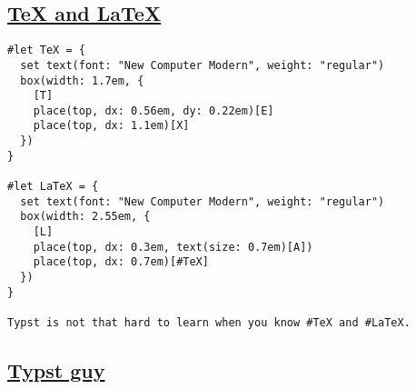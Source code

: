 \subsection{\texorpdfstring{\hyperref[tex-and-latex]{TeX and
LaTeX}}{TeX and LaTeX}}\label{tex-and-latex}

\begin{verbatim}
#let TeX = {
  set text(font: "New Computer Modern", weight: "regular")
  box(width: 1.7em, {
    [T]
    place(top, dx: 0.56em, dy: 0.22em)[E]
    place(top, dx: 1.1em)[X]
  })
}

#let LaTeX = {
  set text(font: "New Computer Modern", weight: "regular")
  box(width: 2.55em, {
    [L]
    place(top, dx: 0.3em, text(size: 0.7em)[A])
    place(top, dx: 0.7em)[#TeX]
  })
}

Typst is not that hard to learn when you know #TeX and #LaTeX.
\end{verbatim}

\pandocbounded{}

\subsection{\texorpdfstring{\hyperref[typst-guy]{Typst
guy}}{Typst guy}}\label{typst-guy}


